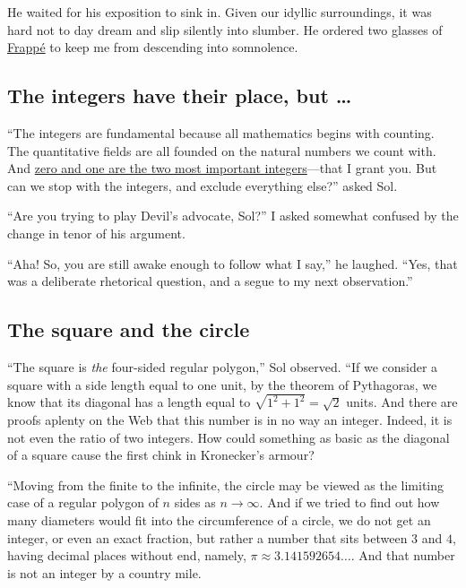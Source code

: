 \documentclass[
  a4paper,
]{article}
\begin{document}
He waited for his exposition to sink in. Given our idyllic surroundings,
it was hard not to day dream and slip silently into slumber. He ordered
two glasses of
\href{https://en.wikipedia.org/wiki/Frapp\%C3\%A9_coffee}{Frappé} to
keep me from descending into somnolence.

\subsection{The integers have their place, but
\ldots{}}\label{the-integers-have-their-place-but}

``The integers are fundamental because all mathematics begins with
counting. The quantitative fields are all founded on the natural numbers
we count with. And
\href{https://swanlotus.netlify.app/blogs/the-two-most-important-numbers-zero-and-one}{zero
and one are the two most important integers}---that I grant you. But can
we stop with the integers, and exclude everything else?'' asked Sol.

``Are you trying to play Devil's advocate, Sol?'' I asked somewhat
confused by the change in tenor of his argument.

``Aha! So, you are still awake enough to follow what I say,'' he
laughed. ``Yes, that was a deliberate rhetorical question, and a segue
to my next observation.''

\subsection{The square and the circle}\label{the-square-and-the-circle}

``The square is \emph{the} four-sided regular polygon,'' Sol observed.
``If we consider a square with a side length equal to one unit, by the
theorem of Pythagoras, we know that its diagonal has a length equal to
\(\sqrt{1^2 + 1^2} = \sqrt{2}\) units. And there are proofs aplenty on
the Web that this number is in no way an integer. Indeed, it is not even
the ratio of two integers. How could something as basic as the diagonal
of a square cause the first chink in Kronecker's armour?

``Moving from the finite to the infinite, the circle may be viewed as
the limiting case of a regular polygon of \(n\) sides as
\(n \to \infty\). And if we tried to find out how many diameters would
fit into the circumference of a circle, we do not get an integer, or
even an exact fraction, but rather a number that sits between \(3\) and
\(4\), having decimal places without end, namely,
\(\pi \approx 3.141592654\dots\). And that number is not an integer by a
country mile.
\end{document}
